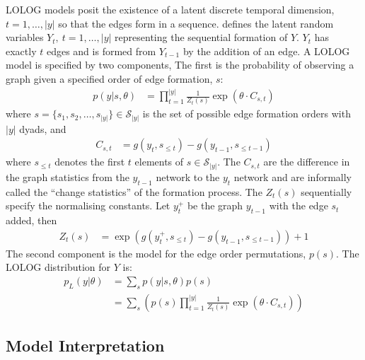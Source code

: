 \documentclass[
]{statsoc}
\begin{document}
LOLOG models posit the existence of a latent discrete temporal
dimension, \(t=1, \ldots , |y|\) so that the edges form in a sequence.
\cite{Fellows2018} defines the latent random variables
\(Y_{t},\ t=1, \ldots , |y|\) representing the sequential formation of
\(Y.\) \(Y_{t}\) has exactly \(t\) edges and is formed from \(Y_{t-1}\)
by the addition of an edge. A LOLOG model is specified by two
components, The first is the probability of observing a graph given a
specified order of edge formation, \(s\): \begin{align}
p(y \vert s,\theta) &= \prod_{t=1}^{|y|} \frac{1}{Z_t(s)} \exp\left(\theta\cdot C_{s,t}\right)
\end{align} \noindent where
\(s=\{s_1, s_2, \ldots, s_{|y|}\} \in \mathscr{S}_{|y|}\) is the set of
possible edge formation orders with \(|y|\) dyads, and \begin{align}
C_{s,t} &= g(y_{t},s_{\leq t}) - g(y_{t-1},s_{\leq t-1})
\end{align} \noindent where \(s_{\leq t}\) denotes the first \(t\)
elements of \(s \in \mathscr{S}_{|y|}\). The \(C_{s,t}\) are the
difference in the graph statistics from the \(y_{t-1}\) network to the
\(y_{t}\) network and are informally called the ``change statistics'' of
the formation process. The \(Z_{t}(s)\) sequentially specify the
normalising constants. Let \(y_{t}^{+}\) be the graph \(y_{t-1}\) with
the edge \(s_{t}\) added, then \begin{align}
Z_{t}(s) &= \exp\left(g(y_{t}^{+},s_{\leq t}) - g(y_{t-1},s_{\leq t-1})\right) + 1
\end{align} The second component is the model for the edge order
permutations, \(p(s)\). The LOLOG distribution for \(Y\) is:
\begin{align}
p_{L}(y \vert \theta) &= \sum_{s} p(y \vert s, \theta)p(s) \nonumber \\
&= \sum_{s} \left( p(s)\prod_{t=1}^{|y|} \frac{1}{Z_t(s)} \exp\left(\theta\cdot C_{s,t}\right)\right) \label{eq:lolog}
\end{align}

\subsection{Model Interpretation}
\end{document}
